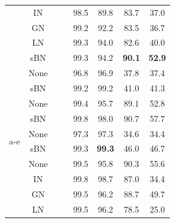 \documentclass{article} %
\newcommand{\cmark}{\ding{51}}%
\newcommand{\xmark}{\ding{55}}%
\begin{document}
\begin{table}[hbtp]
\begin{tabular}{@{}cccccccc@{}}
                      & IN   &                      &                    & 98.5          & 89.8          & 83.7          & 37.0          \\
                      & GN   &                      &                    & 99.2          & 92.2          & 83.5          & 36.7          \\
                      & LN   &                      &                    & 99.3          & 94.0          & 82.6          & 40.0          \\
                      & sBN  &                      &                    & 99.3          & 94.2          & \textbf{90.1} & \textbf{52.9} \\ \midrule
\multirow{11}{*}{a-e} & None & \multirow{2}{*}{\xmark}   & \multirow{2}{*}{\xmark} & 96.8          & 96.9          & 37.8          & 37.4          \\
                      & sBN  &                      &                    & 99.2          & 99.2          & 41.0          & 41.3          \\ \cmidrule(l){2-8} 
                      & None & \multirow{2}{*}{\xmark}   & \multirow{2}{*}{\cmark} & 99.4          & 95.7          & 89.1          & 52.8          \\
                      & sBN  &                      &                    & 99.8          & 98.0          & 90.7          & 57.7          \\ \cmidrule(l){2-8} 
                      & None & \multirow{2}{*}{\cmark}   & \multirow{2}{*}{\xmark} & 97.3          & 97.3          & 34.6          & 34.4          \\
                      & sBN  &                      &                    & 99.3          & \textbf{99.3} & 46.0          & 46.7          \\ \cmidrule(l){2-8} 
                      & None & \multirow{5}{*}{\cmark}   & \multirow{5}{*}{\cmark} & 99.5          & 95.8          & 90.3          & 55.6          \\
                      & IN   &                      &                    & 99.8          & 98.7          & 87.0          & 34.4          \\
                      & GN   &                      &                    & 99.5          & 96.2          & 88.7          & 49.7          \\
                      & LN   &                      &                    & 99.5          & 96.2          & 78.5          & 25.0          \\

\end{tabular}
\end{table}
\end{document}
